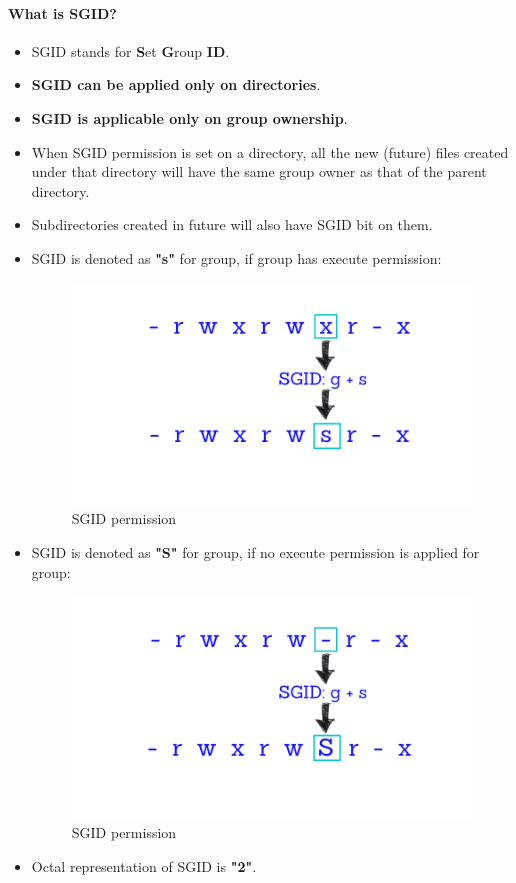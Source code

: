 \setlength{\columnsep}{3pt}
\begin{flushleft}
	\bigskip
	\paragraph{What is SGID?}
	\begin{itemize}
		\item SGID stands for \textbf{S}et \textbf{G}roup \textbf{ID}.
		\item \textbf{SGID can be applied only on directories}.
		\item \textbf{SGID is applicable only on group ownership}.
		\item When SGID permission is set on a directory, all the new (future) files created
		under that directory will have the same group owner as that of the parent
		directory.
		\item Subdirectories created in future will also have SGID bit on them.
		\item SGID is denoted as \textbf{"s"} for group, if group has execute permission:
		\begin{figure}[h!]
			\centering
			\includegraphics[scale=0.3]{content/chapter6/images/adv_perm3.png}
			\caption{SGID permission}
			\label{fig:combination_permission5}
		\end{figure}
		\item SGID is denoted as \textbf{"S"} for group, if no execute permission is applied for group:
		\begin{figure}[h!]
			\centering
			\includegraphics[scale=0.3]{content/chapter6/images/adv_perm4.png}
			\caption{SGID permission}
			\label{fig:combination_permission6}
		\end{figure}
		\item Octal representation of SGID is \textbf{"2"}.
	\end{itemize}
	\newpage	

\end{flushleft}
